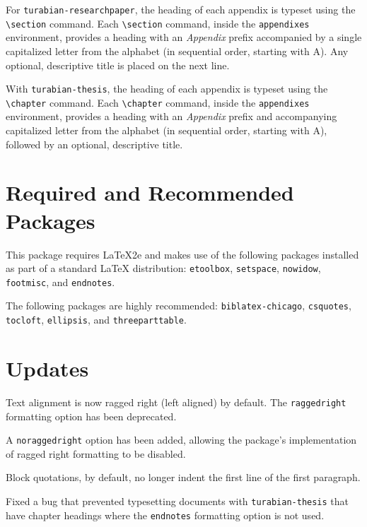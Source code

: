 \documentclass{article}
\newcommand{\textcmd}[1]{\texttt{\textbackslash #1}}
\begin{document}
For \texttt{turabian-researchpaper}, the heading of each appendix is typeset using the \textcmd{section} command. Each \textcmd{section} command, inside the \texttt{appendixes} environment, provides a heading with an \emph{Appendix} prefix accompanied by a single capitalized letter from the alphabet (in sequential order, starting with A). Any optional, descriptive title is placed on the next line.

With \texttt{turabian-thesis}, the heading of each appendix is typeset using the \textcmd{chapter} command. Each \textcmd{chapter} command, inside the \texttt{appendixes} environment, provides a heading with an \emph{Appendix} prefix and accompanying capitalized letter from the alphabet (in sequential order, starting with A), followed by an optional, descriptive title.



\clearpage
\section{Required and Recommended Packages}
\label{sec:required_packages}


This package requires \LaTeX{}2e and makes use of the following packages installed as part of a standard \LaTeX{} distribution: \texttt{etoolbox}, \texttt{setspace}, \texttt{nowidow}, \texttt{footmisc}, and \texttt{endnotes}.

The following packages are highly recommended: \texttt{biblatex-chicago}, \texttt{csquotes}, \texttt{tocloft}, \texttt{ellipsis}, and \texttt{threeparttable}.


\clearpage
\section{Updates}
\label{sec:updates}

%

Text alignment is now ragged right (left aligned) by default. The \texttt{raggedright} formatting option has been deprecated.

A \texttt{noraggedright} option has been added, allowing the package's implementation of ragged right formatting to be disabled.

Block quotations, by default, no longer indent the first line of the first paragraph.

Fixed a bug that prevented typesetting documents with \texttt{turabian-thesis} that have chapter headings where the \texttt{endnotes} formatting option is not used.
\end{document}
